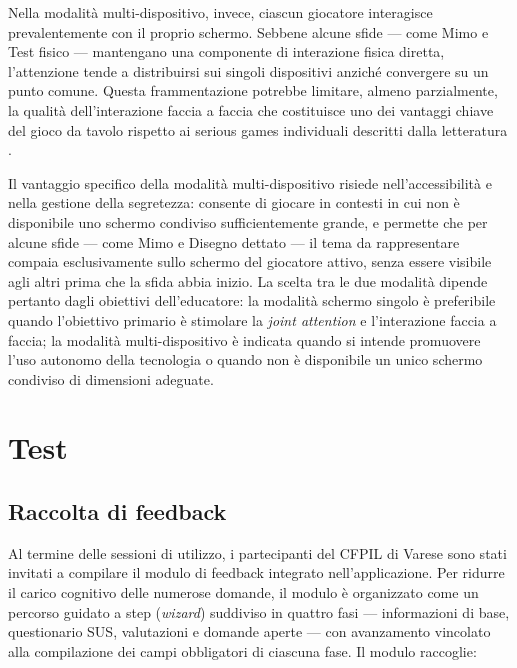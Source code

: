 \documentclass[12pt]{report}
\begin{document}
Nella modalità multi-dispositivo, invece, ciascun giocatore interagisce prevalentemente con il proprio schermo. Sebbene alcune sfide --- come Mimo e Test fisico --- mantengano una componente di interazione fisica diretta, l'attenzione tende a distribuirsi sui singoli dispositivi anziché convergere su un punto comune. Questa frammentazione potrebbe limitare, almeno parzialmente, la qualità dell'interazione faccia a faccia che costituisce uno dei vantaggi chiave del gioco da tavolo rispetto ai serious games individuali descritti dalla letteratura \cite{carneiro2024, atherton2021}.

Il vantaggio specifico della modalità multi-dispositivo risiede nell'accessibilità e nella gestione della segretezza: consente di giocare in contesti in cui non è disponibile uno schermo condiviso sufficientemente grande, e permette che per alcune sfide --- come Mimo e Disegno dettato --- il tema da rappresentare compaia esclusivamente sullo schermo del giocatore attivo, senza essere visibile agli altri prima che la sfida abbia inizio. La scelta tra le due modalità dipende pertanto dagli obiettivi dell'educatore: la modalità schermo singolo è preferibile quando l'obiettivo primario è stimolare la \textit{joint attention} e l'interazione faccia a faccia; la modalità multi-dispositivo è indicata quando si intende promuovere l'uso autonomo della tecnologia o quando non è disponibile un unico schermo condiviso di dimensioni adeguate.

%
%

\chapter{Test}
\label{cap:test}

\section{Raccolta di feedback}
\label{sec:raccolta-feedback}

Al termine delle sessioni di utilizzo, i partecipanti del CFPIL di Varese sono stati invitati a compilare il modulo di feedback integrato nell'applicazione. Per ridurre il carico cognitivo delle numerose domande, il modulo è organizzato come un percorso guidato a step (\emph{wizard}) suddiviso in quattro fasi --- informazioni di base, questionario SUS, valutazioni e domande aperte --- con avanzamento vincolato alla compilazione dei campi obbligatori di ciascuna fase. Il modulo raccoglie:
\end{document}
